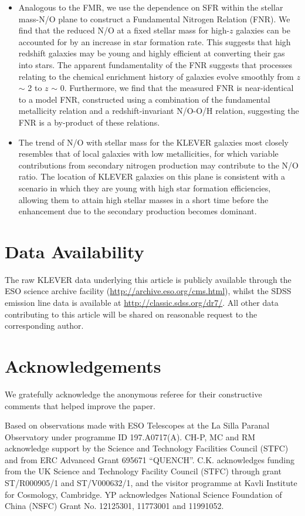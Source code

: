 \documentclass[usenatbib]{mnras} %
\begin{document}
\begin{itemize}
  \item Analogous to the FMR, we use the dependence on SFR within the stellar mass-N/O plane to construct a Fundamental Nitrogen Relation (FNR). We find that the reduced N/O at a fixed stellar mass for high-$z$ galaxies can be accounted for by an increase in star formation rate. This suggests that high redshift galaxies may be young and highly efficient at converting their gas into stars. The apparent fundamentality of the FNR suggests that processes relating to the chemical enrichment history of galaxies evolve smoothly from $z$ $\sim$ 2 to $z$ $\sim$ 0. Furthermore, we find that the measured FNR is near-identical to a model FNR, constructed using a combination of the fundamental metallicity relation and a redshift-invariant N/O-O/H relation, suggesting the FNR is a by-product of these relations.
  \item The trend of N/O with stellar mass for the KLEVER galaxies most closely resembles that of local galaxies with low metallicities, for which variable contributions from secondary nitrogen production may contribute to the N/O ratio. The location of KLEVER galaxies on this plane is consistent with a scenario in which they are young with high star formation efficiencies, allowing them to attain high stellar masses in a short time before the enhancement due to the secondary production becomes dominant.
  
\end{itemize}

\section*{Data Availability}
The raw KLEVER data underlying this article is publicly available
through the ESO science archive facility (\url{http://archive.eso.org/cms.html}), whilst the SDSS emission line data is available at \url{http://classic.sdss.org/dr7/}. All other data contributing to this article will be shared on reasonable request to the corresponding author.

\section*{Acknowledgements}

We gratefully acknowledge the anonymous referee for their constructive comments that helped improve the paper.

Based on observations made with ESO Telescopes at the
La Silla Paranal Observatory under programme ID 197.A0717(A). CH-P, MC and RM acknowledge support by the Science and Technology Facilities Council (STFC) and from ERC Advanced Grant 695671 “QUENCH”. C.K. acknowledges funding from the UK Science and Technology Facility Council (STFC) through grant ST/R000905/1 and ST/V000632/1, and the visitor programme at Kavli Institute for Cosmology, Cambridge. YP acknowledges National Science Foundation of China (NSFC) Grant No. 12125301, 11773001 and 11991052.
\end{document}
